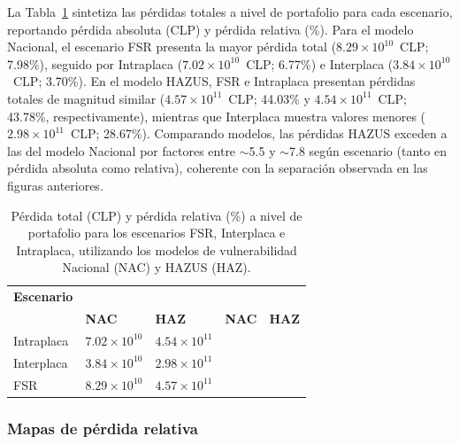 La Tabla~\ref{tab:perdida_total_escenarios} sintetiza las pérdidas totales a nivel de portafolio para cada escenario, reportando pérdida absoluta (CLP) y pérdida relativa (\%). Para el modelo Nacional, el escenario FSR presenta la mayor pérdida total ($8.29\times10^{10}$~CLP; 7.98\%), seguido por Intraplaca ($7.02\times10^{10}$~CLP; 6.77\%) e Interplaca ($3.84\times10^{10}$~CLP; 3.70\%). En el modelo HAZUS, FSR e Intraplaca presentan pérdidas totales de magnitud similar ($4.57\times10^{11}$~CLP; 44.03\% y $4.54\times10^{11}$~CLP; 43.78\%, respectivamente), mientras que Interplaca muestra valores menores ($2.98\times10^{11}$~CLP; 28.67\%). Comparando modelos, las pérdidas HAZUS exceden a las del modelo Nacional por factores entre $\sim$5.5 y $\sim$7.8 según escenario (tanto en pérdida absoluta como relativa), coherente con la separación observada en las figuras anteriores.

\begin{table}[H]
\centering
\small
\setlength{\tabcolsep}{4pt}
\renewcommand{\arraystretch}{1.15}
\caption{Pérdida total (CLP) y pérdida relativa (\%) a nivel de portafolio para los escenarios FSR, Interplaca e Intraplaca, utilizando los modelos de vulnerabilidad Nacional (NAC) y HAZUS (HAZ).}
\label{tab:perdida_total_escenarios}
\begin{tabularx}{0.95\textwidth}{@{}l*{4}{>{\centering\arraybackslash}X}@{}}
\toprule
\textbf{Escenario} &
\multicolumn{2}{c}{\textbf{Pérdida [CLP]}} &
\multicolumn{2}{c}{\textbf{Pérdida relativa [\%]}} \\
\cmidrule(lr){2-3}\cmidrule(lr){4-5}
& \textbf{NAC} & \textbf{HAZ} & \textbf{NAC} & \textbf{HAZ} \\
\midrule
Intraplaca        & $7.02 \times 10^{10}$ & $4.54 \times 10^{11}$ & 6.77 & 43.78 \\
Interplaca & $3.84 \times 10^{10}$ & $2.98 \times 10^{11}$ & 3.70 & 28.67 \\
FSR & $8.29 \times 10^{10}$ & $4.57 \times 10^{11}$ & 7.98 & 44.03 \\
\bottomrule
\end{tabularx}
\end{table}


\subsubsection{Mapas de pérdida relativa}
\label{subsubsec:riesgo_det_mapas_rel}

